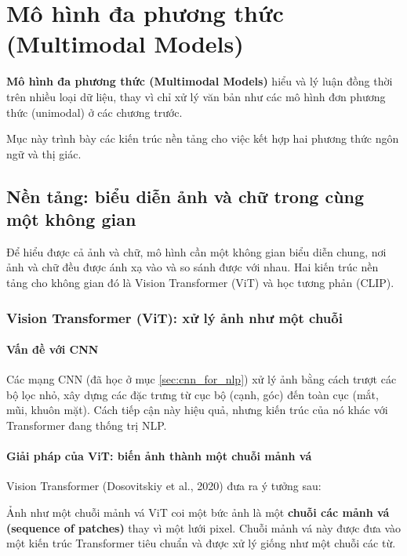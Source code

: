 
\section{Mô hình đa phương thức (Multimodal Models)}
\label{sec:multimodal_models}

\textbf{Mô hình đa phương thức (Multimodal Models)} hiểu và lý luận đồng thời trên nhiều loại dữ liệu, thay vì chỉ xử lý văn bản như các mô hình đơn phương thức (unimodal) ở các chương trước.

Mục này trình bày các kiến trúc nền tảng cho việc kết hợp hai phương thức ngôn ngữ và thị giác.

\subsection{Nền tảng: biểu diễn ảnh và chữ trong cùng một không gian}
\label{ssec:multimodal_foundations}

Để hiểu được cả ảnh và chữ, mô hình cần một không gian biểu diễn chung, nơi ảnh và chữ đều được ánh xạ vào và so sánh được với nhau. Hai kiến trúc nền tảng cho không gian đó là Vision Transformer (ViT) và học tương phản (CLIP).

\subsubsection{Vision Transformer (ViT): xử lý ảnh như một chuỗi}
\paragraph{Vấn đề với CNN}
Các mạng CNN (đã học ở mục \ref{sec:cnn_for_nlp}) xử lý ảnh bằng cách trượt các bộ lọc nhỏ, xây dựng các đặc trưng từ cục bộ (cạnh, góc) đến toàn cục (mắt, mũi, khuôn mặt). Cách tiếp cận này hiệu quả, nhưng kiến trúc của nó khác với Transformer đang thống trị NLP.

\paragraph{Giải pháp của ViT: biến ảnh thành một chuỗi mảnh vá}
Vision Transformer (Dosovitskiy et al., 2020) đưa ra ý tưởng sau:
\begin{keyidea}{Ảnh như một chuỗi mảnh vá}
ViT coi một bức ảnh là một \textbf{chuỗi các mảnh vá (sequence of patches)} thay vì một lưới pixel. Chuỗi mảnh vá này được đưa vào một kiến trúc Transformer tiêu chuẩn và được xử lý giống như một chuỗi các từ.
\end{keyidea}


